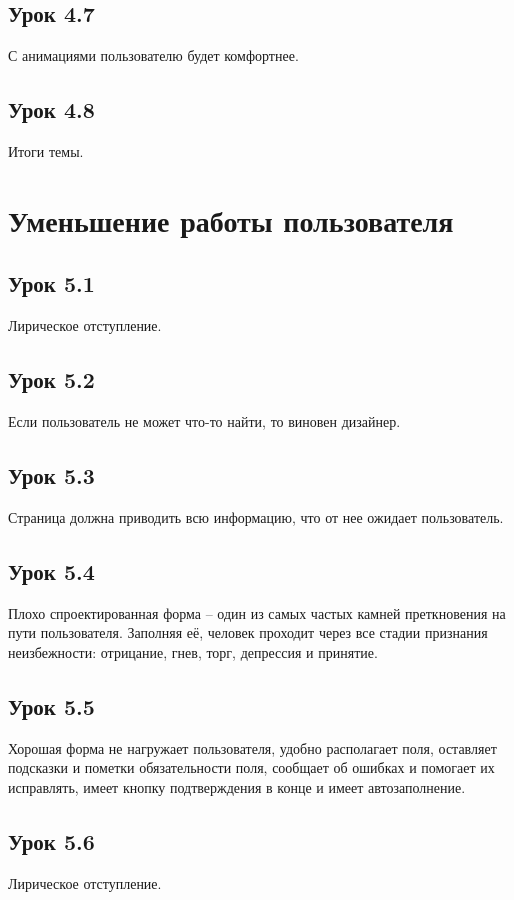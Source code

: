 \documentclass[variant=practice]{bsuir}
\begin{document}
\subsection{Урок 4.7} С анимациями пользователю будет комфортнее.

\subsection{Урок 4.8} Итоги темы.

\section{Уменьшение работы пользователя}

\subsection{Урок 5.1} Лирическое отступление.

\subsection{Урок 5.2} Если пользователь не может что-то найти, то виновен
дизайнер.

\subsection{Урок 5.3} Страница должна приводить всю информацию, что от нее
ожидает пользователь.

\subsection{Урок 5.4} Плохо спроектированная форма -- один из самых частых
камней преткновения на пути пользователя. Заполняя её, человек проходит через
все стадии признания неизбежности: отрицание, гнев, торг, депрессия и принятие.

\subsection{Урок 5.5} Хорошая форма не нагружает пользователя, удобно
располагает поля, оставляет подсказки и пометки обязательности поля, сообщает об
ошибках и помогает их исправлять, имеет кнопку подтверждения в конце и имеет
автозаполнение.

\subsection{Урок 5.6} Лирическое отступление.
\end{document}
